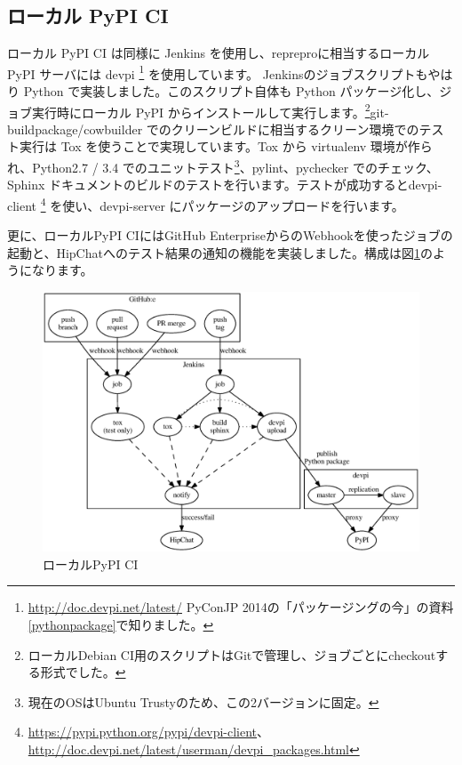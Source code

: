 \documentclass[mingoth,a4paper]{jsarticle}
\begin{document}
\subsection{ローカル PyPI CI}

ローカル PyPI CI は同様に Jenkins を使用し、repreproに相当するローカル PyPI サーバには devpi \footnote{\url{http://doc.devpi.net/latest/} PyConJP 2014の「パッケージングの今」の資料\ref{pythonpackage}で知りました。} を使用しています。
Jenkinsのジョブスクリプトもやはり Python で実装しました。このスクリプト自体も Python パッケージ化し、ジョブ実行時にローカル PyPI からインストールして実行します。\footnote{ローカルDebian CI用のスクリプトはGitで管理し、ジョブごとにcheckoutする形式でした。}git-buildpackage/cowbuilder でのクリーンビルドに相当するクリーン環境でのテスト実行は Tox を使うことで実現しています。Tox から virtualenv 環境が作られ、Python2.7 / 3.4 でのユニットテスト\footnote{現在のOSはUbuntu Trustyのため、この2バージョンに固定。}、pylint、pychecker でのチェック、Sphinx ドキュメントのビルドのテストを行います。テストが成功するとdevpi-client \footnote{\url{https://pypi.python.org/pypi/devpi-client}、\url{http://doc.devpi.net/latest/userman/devpi_packages.html}} を使い、devpi-server にパッケージのアップロードを行います。

更に、ローカルPyPI CIにはGitHub EnterpriseからのWebhookを使ったジョブの起動と、HipChatへのテスト結果の通知の機能を実装しました。構成は図\ref{fig:pypi-ci}のようになります。

\begin{figure}[h]
  \begin{center}
  \includegraphics[width=0.6\hsize]{image201504/python-ci.eps}
  \caption{ローカルPyPI CI}
  \label{fig:pypi-ci}
  \end{center}
\end{figure}
\end{document}
